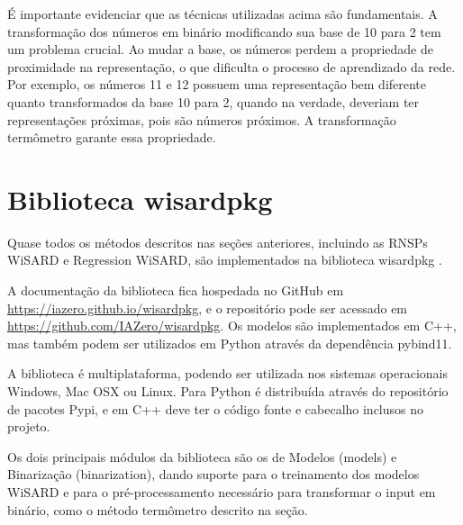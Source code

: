     É importante evidenciar que as técnicas utilizadas acima são fundamentais. A transformação dos números em binário modificando sua base de 10 para 2 tem um problema crucial. Ao mudar a base, os números perdem a propriedade de proximidade na representação, o que dificulta o processo de aprendizado da rede. Por exemplo, os números 11 e 12 possuem uma representação bem diferente quanto transformados da base 10 para 2, quando na verdade, deveriam ter representações próximas, pois são números próximos. A transformação termômetro garante essa propriedade. 
    
\section{Biblioteca wisardpkg}
    Quase todos os métodos descritos nas seções anteriores, incluindo as RNSPs WiSARD e Regression WiSARD, são implementados na biblioteca wisardpkg \cite{wisardpkg}.

    A documentação da biblioteca fica hospedada no GitHub em \url{https://iazero.github.io/wisardpkg}, e o repositório pode ser acessado em \url{https://github.com/IAZero/wisardpkg}. Os modelos são implementados em C++, mas também podem ser utilizados em Python através da dependência pybind11.

    A biblioteca é multiplataforma, podendo ser utilizada nos sistemas operacionais Windows, Mac OSX ou Linux. Para Python é distribuída através do repositório de pacotes Pypi, e em C++ deve ter o código fonte e cabecalho inclusos no projeto.

    Os dois principais módulos da biblioteca são os de Modelos (models) e Binarização (binarization), dando suporte para o treinamento dos modelos WiSARD e para o pré-processamento necessário para transformar o input em binário, como o método termômetro descrito na seção.